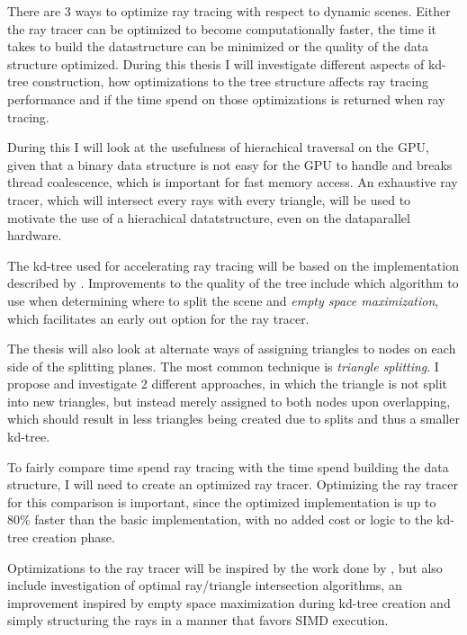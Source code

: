 There are 3 ways to optimize ray tracing with respect to dynamic
scenes. Either the ray tracer can be optimized to become
computationally faster, the time it takes to build the datastructure
can be minimized or the quality of the data structure
optimized. During this thesis I will investigate different aspects of
kd-tree construction, how optimizations to the tree structure affects
ray tracing performance and if the time spend on those optimizations
is returned when ray tracing.


During this I will look at the usefulness of hierachical traversal on
the GPU, given that a binary data structure is not easy for the GPU to
handle and breaks thread coalescence, which is important for fast
memory access. An exhaustive ray tracer, which will intersect every
rays with every triangle, will be used to motivate the use of a
hierachical datatstructure, even on the dataparallel hardware.

The kd-tree used for accelerating ray tracing will be based on the
implementation described by \zhou.  Improvements to the quality of the
tree include which algorithm to use when determining where to split
the scene and \textit{empty space maximization}, which facilitates an
early out option for the ray tracer.

The thesis will also look at alternate ways of assigning triangles to
nodes on each side of the splitting planes. The most common technique
is \textit{triangle splitting}. I propose and investigate 2 different
approaches, in which the triangle is not split into new triangles, but
instead merely assigned to both nodes upon overlapping, which should
result in less triangles being created due to splits and thus a
smaller kd-tree.

To fairly compare time spend ray tracing with the time spend building
the data structure, I will need to create an optimized ray
tracer. Optimizing the ray tracer for this comparison is important,
since the optimized implementation is up to 80\% faster than the basic
implementation, with no added cost or logic to the kd-tree creation
phase.

Optimizations to the ray tracer will be inspired by the work done by
\horn , but also include investigation of optimal ray/triangle
intersection algorithms, an improvement inspired by empty space
maximization during kd-tree creation and simply structuring the rays in a
manner that favors SIMD execution.


